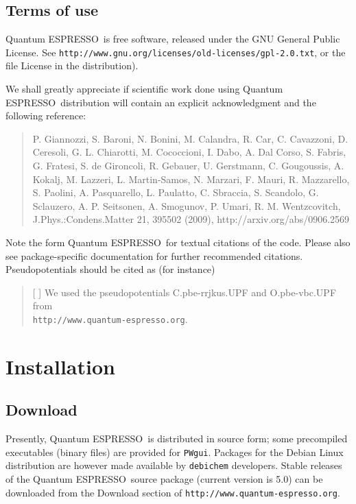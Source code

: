 \documentclass[12pt,a4paper]{article}
\def\version{5.0}
\def\qe{{\sc Quantum ESPRESSO}}
\begin{document}
\subsection{Terms of use}
\label{SubSec:Terms}

\qe\ is free software, released under the 
GNU General Public License. See
\texttt{http://www.gnu.org/licenses/old-licenses/gpl-2.0.txt}, 
or the file License in the distribution).
    
We shall greatly appreciate if scientific work done using \qe\ distribution will 
contain an explicit acknowledgment and the following reference:
\begin{quote}
P. Giannozzi, S. Baroni, N. Bonini, M. Calandra, R. Car, C. Cavazzoni,
D. Ceresoli, G. L. Chiarotti, M. Cococcioni, I. Dabo, A. Dal Corso,
S. Fabris, G. Fratesi, S. de Gironcoli, R. Gebauer, U. Gerstmann,
C. Gougoussis, A. Kokalj, M. Lazzeri, L. Martin-Samos, N. Marzari,
F. Mauri, R. Mazzarello, S. Paolini, A. Pasquarello, L. Paulatto,
C. Sbraccia, S. Scandolo, G. Sclauzero, A. P. Seitsonen, A. Smogunov,
P. Umari, R. M. Wentzcovitch, J.Phys.:Condens.Matter 21, 395502 (2009),
http://arxiv.org/abs/0906.2569
\end{quote}
Note the form \qe\ for textual citations of the code.
Please also see package-specific documentation for
further recommended citations.
Pseudopotentials should be cited as (for instance)
\begin{quote}
[ ] We used the pseudopotentials C.pbe-rrjkus.UPF
and O.pbe-vbc.UPF from\\
\texttt{http://www.quantum-espresso.org}.
\end{quote}
\section{Installation}

\subsection{Download}
 
Presently, \qe\ is distributed in source form; some precompiled 
executables (binary files) are provided for \texttt{PWgui}.
Packages for the Debian Linux distribution are however 
made available by \texttt{debichem} developers.
Stable releases of the \qe\ source package (current version 
is \version) can be downloaded from the Download section
of \texttt{http://www.quantum-espresso.org}.
\end{document}
